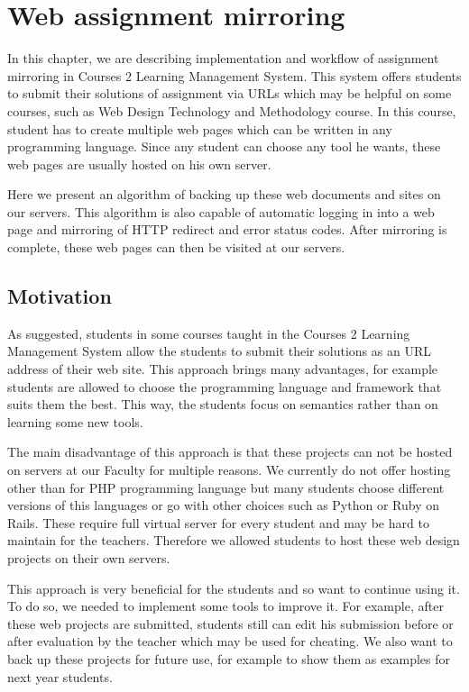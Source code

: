 \chapter{Web assignment mirroring}
\label{sec:mirroring}

In this chapter, we are describing implementation and workflow of assignment mirroring in Courses 2 Learning Management System. This system offers students to submit their solutions of assignment via URLs which may be helpful on some courses, such as Web Design Technology and Methodology course. In this course, student has to create multiple web pages which can be written in any programming language. Since any student can choose any tool he wants, these web pages are usually hosted on his own server. 

Here we present an algorithm of backing up these web documents and sites on our servers. This algorithm is also capable of automatic logging in into a web page and mirroring of HTTP redirect and error status codes. After mirroring is complete, these web pages can then be visited at our servers.

\section{Motivation}
As suggested, students in some courses taught in the Courses 2 Learning Management System allow the students to submit their solutions as an URL address of their web site. This approach brings many advantages, for example students are allowed to choose the programming language and framework that suits them the best. This way, the students focus on semantics rather than on learning some new tools.

The main disadvantage of this approach is that these projects can not be hosted on servers at our Faculty for multiple reasons. We currently do not offer hosting other than for PHP programming language but many students choose different versions of this languages or go with other choices such as Python or Ruby on Rails. These require full virtual server for every student and may be hard to maintain for the teachers. Therefore we allowed students to host these web design projects on their own servers.

This approach is very beneficial for the students and so want to continue using it. To do so, we needed to implement some tools to improve it. For example, after these web projects are submitted, students still can edit his submission before or after evaluation by the teacher which may be used for cheating. We also want to back up these projects for future use, for example to show them as examples for next year students.

